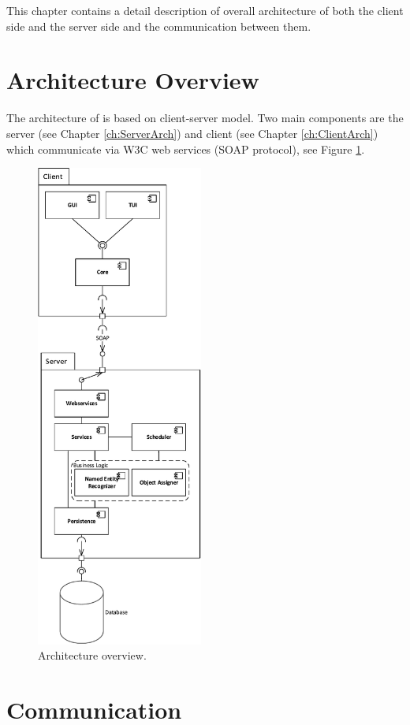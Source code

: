 
This chapter contains a detail description of overall architecture of both the client
side and the server side and the communication between them. 

\section{Architecture Overview}

The architecture of \textan{} is based on client-server model. Two main components
are the \textan{} server (see Chapter \ref{ch:ServerArch}) and \textan{} client 
(see Chapter \ref{ch:ClientArch}) which communicate via W3C web services
(SOAP protocol), see Figure \ref{fig:Architecture}.

\begin{figure}[!htb]
        \centering
        \includegraphics[height=16cm]{Images/Architecture}
        \caption{Architecture overview.}
        \label{fig:Architecture}
\end{figure}

\section{Communication}
\label{sec:Communication}

